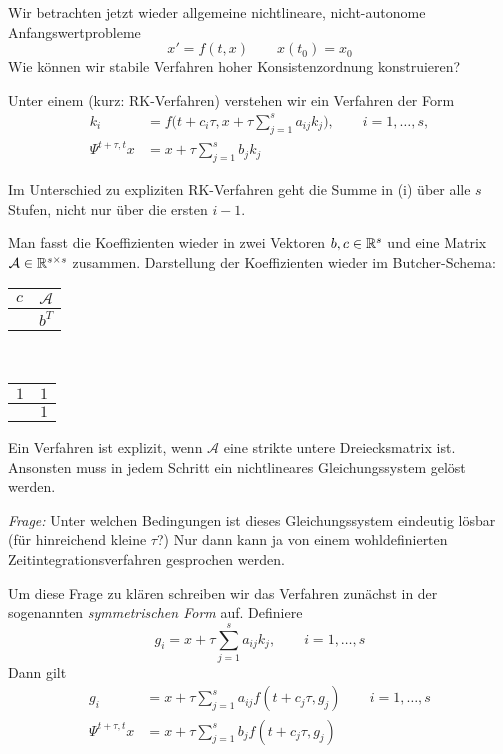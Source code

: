 Wir betrachten jetzt wieder allgemeine nichtlineare, nicht-autonome Anfangswertprobleme
\begin{equation*}
	x' = f(t,x) \qquad x(t_0) = x_0
\end{equation*}
Wie können wir stabile Verfahren hoher Konsistenzordnung konstruieren?

\begin{defi}[Butcher 1964]
	Unter einem  (kurz: RK-Verfahren) verstehen wir ein Verfahren der Form
	\begin{align*}
		k_i &= f\Big(t + c_i \tau, x + \tau \sum_{j=1}^s a_{ij} k_j\Big), \qquad i=1,\dots,s, \tag{i}\\
		\Psi^{t + \tau,t} x &= x + \tau \sum_{j=1}^s b_j k_j \tag{ii}
	\end{align*}
\end{defi}

Im Unterschied zu expliziten RK-Verfahren geht die Summe in (i) über alle $s$ Stufen, nicht nur über die ersten $i-1$.

Man fasst die Koeffizienten wieder in zwei Vektoren $b,c \in \mathbb R^s$ und eine Matrix $\mathcal A \in \mathbb R^{s\times s}$
zusammen. Darstellung der Koeffizienten wieder im Butcher-Schema:
\begin{center}
	\begin{tabular}{c|c}
		$c$ & $\mathcal A$ \\ \hline
		& $b^T$
	\end{tabular}
\end{center}

\begin{bsp}~\\
	\begin{center}
		\begin{tabular}{c|c}
			$1$ & $1$ \\ \hline
			& $1$
		\end{tabular}
	\end{center}
\end{bsp}

Ein Verfahren ist explizit, wenn $\mathcal A$ eine strikte untere Dreiecksmatrix ist. Ansonsten muss in jedem Schritt ein nichtlineares Gleichungssystem gelöst werden.

\emph{Frage:} Unter welchen Bedingungen ist dieses Gleichungssystem eindeutig lösbar (für hinreichend kleine $\tau$?) Nur dann kann ja von einem wohldefinierten Zeitintegrationsverfahren gesprochen werden.

Um diese Frage zu klären schreiben wir das Verfahren zunächst in der sogenannten
\emph{symmetrischen Form} auf. Definiere
\begin{equation*}
	g_i = x + \tau \sum_{j=1}^s a_{ij} k_j,
	\qquad
	i=1,\dots,s
\end{equation*}
Dann gilt
\begin{align*}
	g_i
	& = x + \tau \sum_{j=1}^s a_{ij} f(t + c_j \tau, g_j)
	\qquad i=1,\dots,s \\
	\Psi^{t+\tau,t} x
	& = x + \tau \sum_{j=1}^s b_j f(t + c_j \tau, g_j)
\end{align*}


